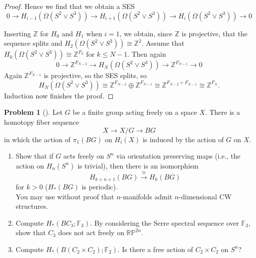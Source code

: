 \documentclass[reqno]{amsart}
\theoremstyle{definition}
\newtheorem{problem}[theorem]{Problem}
\theoremstyle{remark}
\begin{document}
\begin{proof}
Hence we find that we obtain a SES
\[
0 \to  H_{i-1} \left( \Omega \left( S^2 \vee S^3 \right)  \right) 
\to H_{i+1} \left( \Omega \left( 
S^2 \vee S^3 \right)  \right) 
\to H_i \left( \Omega \left( S^2 \vee S^3 \right)  \right) 
\to 0
\] 
        
Inserting $\mathbb{Z}$ for
$H_{0}$ and
$H_1$ when $i = 1$,
we obtain, since $\mathbb{Z}$ is projective,
that the sequence splits
and $H_2 \left( \Omega
\left( S^2 \vee S^3 \right) \right) \cong
\mathbb{Z}^2$. Assume that
$H_k \left( \Omega
\left( S^2 \vee S^3 \right) \right) \cong
\mathbb{Z}^{F_k}$ for $k\le N-1$.
Then again
\[
0 \to \mathbb{Z}^{F_{N-2}}
\to H_{N}\left( \Omega \left( S^2 \vee S^3 \right)  \right) 
\to \mathbb{Z}^{F_{N-1}} \to 0
\] 
Again $\mathbb{Z}^{F_{N-1}}$ is projective, so the
SES splits, so
\[
    H_{N}\left( \Omega \left( S^2 \vee S^3 \right)  \right) 
\cong
\mathbb{Z}^{F_{N-2}}
\oplus \mathbb{Z}^{F_{N-1}}
\cong \mathbb{Z}^{F_{N-2} + F_{N-1}}
\cong \mathbb{Z}^{F_N}.
\]
Induction now finishes the proof.






    \end{proof}





    \begin{problem}[]
        Let $G$ be a finite group acting freely on a space
        $X$. There is a homotopy fiber sequence
        \[
        X \to X /G \to BG
        \] 
        in which the action of $\pi_1 (BG)$ on
        $H_i(X)$ is induced by the action
        of $G$ on $X$.
        \begin{enumerate}
            \item Show that if $G$ acts freely
                on $S^{n}$ via orientation preserving
                maps (i.e., the action on
                $H_n(S^{n})$ is trivial), then
                there is an isomorphism
                \[
                H_{k+n+1}(BG) \stackrel{\cong}{\to} 
                H_k(BG)
                \] 
                for $k>0$ ($H_*(BG)$ is periodic).\\
                You may use without proof that
                $n$-manifolds admit $n$-dimensional CW structures.
            \item Compute $H_* (BC_3 ; \mathbb{F}_3)$.
                By considering the Serre spectral sequence
                over $\mathbb{F}_3$, show that
                $C_3$ does not act freely on 
                $\mathbb{R}\mathbb{P}^{2n}$.
            \item Compute $H_{*}\left( B
                \left( C_2 \times C_2 \right) ; \mathbb{F}_2\right) $.
                Is there a free action of $C_2 \times C_2$ on
                 $S^{n}$?
        \end{enumerate}
    \end{problem}
\end{document}
